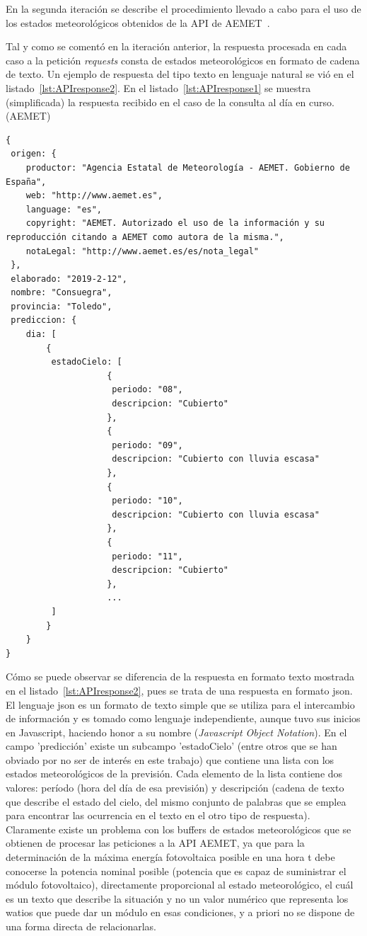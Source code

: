 En la segunda iteración se describe el procedimiento llevado a cabo para el uso de los estados meteorológicos obtenidos de la API de AEMET~\cite{Aemet}.

Tal y como se comentó en la iteración anterior, la respuesta procesada en cada caso a la petición \textit{requests} consta de estados meteorológicos en formato de cadena de texto. Un ejemplo de respuesta del tipo texto en lenguaje natural se vió en el listado~\ref{lst:APIresponse2}. En el listado~\ref{lst:APIresponse1} se muestra (simplificada) la respuesta recibido en el caso de la consulta al día en curso. (\textcopyright AEMET)

\begin{lstlisting}[numbers=none,float=ht,caption={Ejemplo de respuesta de la API - AEMET para el día en curso},label={lst:APIresponse1}]
{
 origen: {
	productor: "Agencia Estatal de Meteorología - AEMET. Gobierno de España",
	web: "http://www.aemet.es",
	language: "es",
	copyright: "AEMET. Autorizado el uso de la información y su reproducción citando a AEMET como autora de la misma.",
	notaLegal: "http://www.aemet.es/es/nota_legal"
 },
 elaborado: "2019-2-12",
 nombre: "Consuegra",
 provincia: "Toledo",
 prediccion: {
 	dia: [
		{
		 estadoCielo: [
					{
					 periodo: "08",
					 descripcion: "Cubierto"
					},
					{
					 periodo: "09",
					 descripcion: "Cubierto con lluvia escasa"
					},
					{
					 periodo: "10",
					 descripcion: "Cubierto con lluvia escasa"
					},
					{
					 periodo: "11",
					 descripcion: "Cubierto"
					},
					...
		 ]
		}
	}
}
\end{lstlisting}

Cómo se puede observar se diferencia de la respuesta en formato texto mostrada en el listado~\ref{lst:APIresponse2}, pues se trata de una respuesta en formato json. El lenguaje json es un formato de texto simple que se utiliza para el intercambio de información y es tomado como lenguaje independiente, aunque tuvo sus inicios en Javascript, haciendo honor a su nombre (\textit{Javascript Object Notation}). En el campo 'predicción' existe un subcampo 'estadoCielo' (entre otros que se han obviado por no ser de interés en este trabajo) que contiene una lista con los estados meteorológicos de la previsión. Cada elemento de la lista contiene dos valores: período (hora del día de esa previsión) y descripción (cadena de texto que describe el estado del cielo, del mismo conjunto de palabras que se emplea para encontrar las ocurrencia en el texto en el otro tipo de respuesta). Claramente existe un problema con los buffers de estados meteorológicos que se obtienen de procesar las peticiones a la API AEMET, ya que para la determinación de la máxima energía fotovoltaica posible en una hora t debe conocerse la potencia nominal posible (potencia que es capaz de suministrar el módulo fotovoltaico), directamente proporcional al estado meteorológico, el cuál es un texto que describe la situación y no un valor numérico que representa los watios que puede dar un módulo en esas condiciones, y a priori no se dispone de una forma directa de relacionarlas. \\

